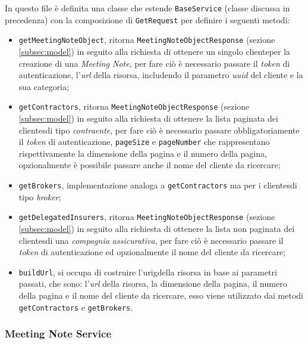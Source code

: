 In questo file è definita una classe che estende \lstinline{BaseService} (classe discussa in precedenza) con la composizione di \lstinline{GetRequest} per definire i seguenti metodi:
\begin{itemize}
    \item \lstinline{getMeetingNoteObject}, ritorna \lstinline{MeetingNoteObjectResponse} (sezione \ref{subsec:model}) in seguito alla richiesta di ottenere un singolo \gls{cliente}\glsoccur per la creazione di una \emph{Meeting Note}, per fare ciò è necessario passare il \emph{token} di autenticazione, l'\emph{url} della risorsa, includendo il parametro \emph{uuid} del cliente e la sua categoria;
    \item \lstinline{getContractors}, ritorna \lstinline{MeetingNoteObjectResponse} (sezione \ref{subsec:model}) in seguito alla richiesta di ottenere la lista paginata dei \glspl{cliente}\glsoccur di tipo \emph{contraente}, per fare ciò è necessario passare obbligatoriamente il \emph{token} di autenticazione, \lstinline{pageSize} e \lstinline{pageNumber} che rappresentano rispettivamente la dimensione della pagina e il numero della pagina, opzionalmente è possibile passare anche il nome del \gls{cliente} da ricercare;
    \item \lstinline{getBrokers}, implementazione analoga a \lstinline{getContractors} ma per i \glspl{cliente}\glsoccur di tipo \emph{broker};
    \item \lstinline{getDelegatedInsurers}, ritorna \lstinline{MeetingNoteObjectResponse} (sezione \ref{subsec:model}) in seguito alla richiesta di ottenere la lista non paginata dei \glspl{cliente}\glsoccur di una \emph{compagnia assicurativa}, per fare ciò è necessario passare il \emph{token} di autenticazione ed opzionalmente il nome del \gls{cliente} da ricercare;
    \item \lstinline{buildUrl}, si occupa di costruire l'\gls{urig}\glsoccur della risorsa in base ai parametri passati, che sono: l'\emph{url} della risorsa, la dimensione della pagina, il numero della pagina e il nome del \gls{cliente} da ricercare, esso viene utilizzato dai metodi \lstinline{getContractors} e \lstinline{getBrokers}.
\end{itemize}

\subsubsection*{Meeting Note Service}
\label{subsubsec:meeting-note-service}

